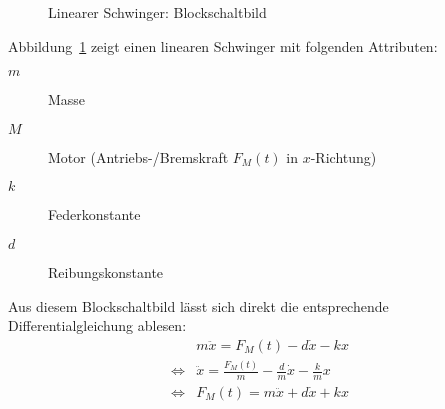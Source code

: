 \begin{figure}
            	\caption{Linearer Schwinger: Blockschaltbild}
                \label{fig:linearerSchwinger}
            \end{figure}
            
            Abbildung~\ref{fig:linearerSchwinger} zeigt einen linearen Schwinger mit folgenden Attributen:
            \begin{description}
            	\item[\(m\)] Masse
            	\item[\(M\)] Motor (Antriebs-/Bremskraft \( F _ M (t) \) in \(x\)-Richtung)
            	\item[\(k\)] Federkonstante
            	\item[\(d\)] Reibungskonstante
            \end{description}
            
            Aus diesem Blockschaltbild lässt sich direkt die entsprechende Differentialgleichung ablesen:
            \begin{align*}
	                 & m\ddot{x} = F _ M (t) - d\dot{x} - kx \tag{Grundform} \\
	            \iff & \ddot{x} = \frac{F _ M (t)}{m} - \frac{d}{m} \dot{x} - \frac{k}{m} x \tag{Normalisiert} \\
	            \iff & F _ M (t) = m\ddot{x} + d\dot{x} + kx \tag{Motorkraft}
            \end{align*}
            
